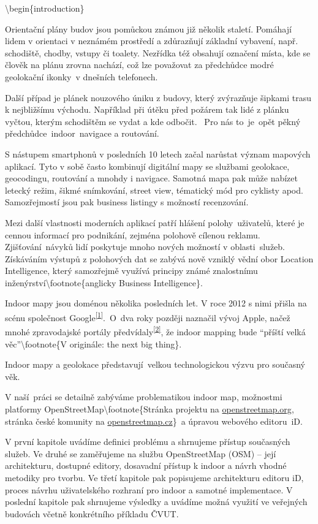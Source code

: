 \textbackslash{}begin\{introduction\}

Orientační plány budov jsou pomůckou známou již několik staletí. Pomáhají lidem v orientaci v neznámém prostředí a zdůrazňují základní vybavení, např. schodiště, chodby, vstupy či toalety. Nezřídka též obsahují označení místa, kde se člověk na plánu zrovna nachází, což lze považovat za předchůdce modré geolokační ikonky~v dnešních telefonech.

Další případ je plánek nouzového úniku z budovy, který zvýrazňuje šipkami trasu k nejbližšímu východu. Například při útěku před požárem tak lidé z plánku vyčtou, kterým schodištěm se vydat a kde odbočit. ~Pro nás to~je~opět pěkný předchůdce~indoor~navigace a routování.

S nástupem smartphonů v posledních 10 letech začal narůstat význam mapových aplikací. Tyto v sobě často kombinují digitální mapy se službami geolokace, geocodingu, routování a mnohdy i navigace. Samotná mapa pak může nabízet letecký režim, šikmé snímkování, street view, tématický mód pro cyklisty apod. Samozřejmostí jsou pak business listingy s možností recenzování.

Mezi další vlastnosti moderních aplikací patří hlášení polohy~uživatelů, které je cennou informací pro podnikání, zejména polohově cílenou reklamu. Zjišťování~návyků lidí poskytuje mnoho nových možností v oblasti~služeb. Získáváním výstupů z polohových dat se zabývá nově vzniklý vědní obor Location Intelligence, který samozřejmě využívá principy známé znalostnímu inženýrství\textbackslash{}footnote\{anglicky Business Intelligence\}.

Indoor mapy jsou doménou několika posledních let. V roce 2012 s nimi přišla na scénu společnost Google\textsuperscript{\href{}{{[}1{]}}}.~O~dva roky později naznačil vývoj Apple, načež mnohé zpravodajské portály předvídaly\textsuperscript{\href{}{{[}2{]}}}, že indoor mapping bude ``příští velká věc''\textbackslash{}footnote\{V originále: the next big thing\}.

Indoor mapy a geolokace představují~velkou technologickou výzvu pro současný věk.

V naší~práci se detailně zabýváme problematikou indoor map, možnostmi platformy OpenStreetMap\textbackslash{}footnote\{Stránka projektu na \href{}{openstreetmap.org}, stránka české komunity na \href{}{openstreetmap.cz}\}~a úpravou webového editoru~iD.

V první kapitole uvádíme definici problému a shrnujeme přístup současných služeb. Ve druhé se zaměřujeme na službu OpenStreetMap (OSM) -- její architekturu, dostupné editory, dosavadní přístup k indoor a návrh vhodné metodiky pro tvorbu. Ve třetí kapitole pak popisujeme architekturu editoru iD, proces návrhu uživatelského rozhraní pro indoor a samotné implementace. V poslední kapitole pak shrnujeme výsledky a uvádíme možná využití ve veřejných budovách včetně konkrétního příkladu ČVUT.

